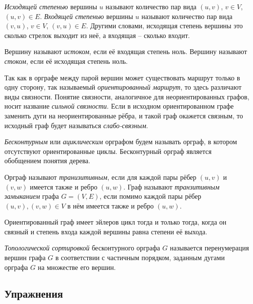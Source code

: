 \emph{Исходящей степенью} вершины $u$ называют количество пар вида $(u,v)$, $v \in V$, $(u,v) \in E$. \emph{Входящей степенью} вершины $u$ называют количество пар вида $(v,u)$, $v \in V$, $(v,u) \in E$. Другими словами, исходящая степень вершины это сколько стрелок выходит из неё, а входящая -- сколько входит.

Вершину называют \emph{истоком}, если её входящая степень ноль. Вершину называют \emph{стоком}, если её исходящая степень ноль.

Так как в орграфе между парой вершин может существовать маршрут только в одну 
сторону, так называемый \emph{ориентированный маршрут}, то здесь различают виды 
связности. Понятие связности, аналогичное для неориентированных графов, носит 
название \emph{сильной связности}. Если в исходном ориентированном графе 
заменить дуги на неориентированные рёбра, и такой граф окажется связным, то 
исходный граф будет называться \emph{слабо-связным}.

\emph{Бесконтурным} или \emph{ациклическим} орграфом будем называть орграф, в 
котором отсутствуют ориентированные циклы. Бесконтурный орграф является 
обобщением понятия дерева.

Орграф называют \emph{транизитивным}, если для каждой пары рёбер $(u,v)$ и $(v,w)$ имеется также и ребро $(u,w)$. Граф называют \emph{транзитивным замыканием} графа $G=(V,E)$, если помимо каждой пары рёбер $(u,v), (v,w) \in V$ в нём имеется также и ребро $(u,w)$.

\begin{theorem}
Ориентированный граф имеет эйлеров цикл тогда и только тогда, когда он связный 
и степень входа каждой вершины равна степени её выхода.
\end{theorem}

\emph{Топологической сортировкой} бесконтурного орграфа $G$ называется 
перенумерация вершин графа $G$ в соответствии с частичным порядком, заданным 
дугами орграфа $G$ на множестве его вершин.

\subsection{Упражнения}

